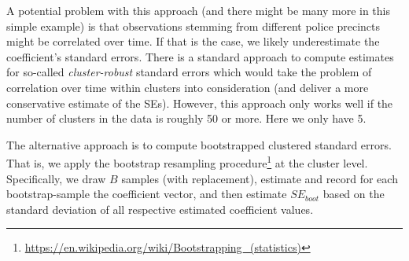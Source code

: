 \documentclass[
  12pt,
]{style/krantz}
\renewcommand{\href}[2]{#2\footnote{\url{#1}}}
\begin{document}
A potential problem with this approach (and there might be many more in this simple example) is that observations stemming from different police precincts might be correlated over time. If that is the case, we likely underestimate the coefficient's standard errors. There is a standard approach to compute estimates for so-called \emph{cluster-robust} standard errors which would take the problem of correlation over time within clusters into consideration (and deliver a more conservative estimate of the SEs). However, this approach only works well if the number of clusters in the data is roughly 50 or more. Here we only have 5.

The alternative approach is to compute bootstrapped clustered standard errors. That is, we apply the \href{https://en.wikipedia.org/wiki/Bootstrapping_(statistics)}{bootstrap resampling procedure} at the cluster level. Specifically, we draw \(B\) samples (with replacement), estimate and record for each bootstrap-sample the coefficient vector, and then estimate \(SE_{boot}\) based on the standard deviation of all respective estimated coefficient values.
\end{document}
